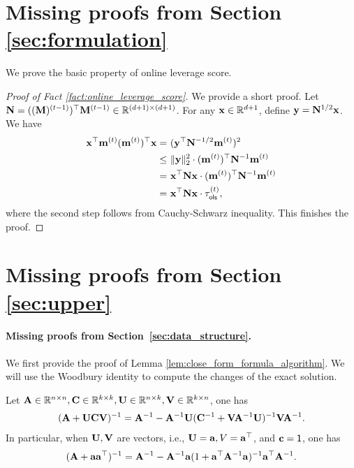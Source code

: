 \section{Missing proofs from Section \ref{sec:formulation}}
\label{sec:pre-app}
We prove the basic property of online leverage score. 
\begin{proof}[Proof of Fact \ref{fact:online_leverage_score}]
We provide a short proof.
Let $\mathbf{N} =  ((\mathbf{M})^{(t-1)})^\top \mathbf{M}^{(t-1)} \in \mathbb{R}^{(d+1)\times (d+1)}$. For any $\mathbf{x} \in \mathbb{R}^{d+1}$, define $\mathbf{y} = \mathbf{N}^{1/2} \mathbf{x}$. We have
\begin{align*}
\mathbf{x}^{\top} \mathbf{m}^{(t)} (\mathbf{m}^{(t)})^{\top} \mathbf{x} = &~ (\mathbf{y}^{\top} \mathbf{N}^{-1/2} \mathbf{m}^{(t)})^2 \\
\leq &~ \|\mathbf{y}\|_2^2 \cdot (\mathbf{m}^{(t)})^{\top} \mathbf{N}^{-1} \mathbf{m}^{(t)} \\
= &~ \mathbf{x}^{\top} \mathbf{N} \mathbf{x} \cdot (\mathbf{m}^{(t)})^{\top} \mathbf{N}^{-1} \mathbf{m}^{(t)} \\
= &~ \mathbf{x}^{\top} \mathbf{N} \mathbf{x} \cdot \tau_{\mathsf{ols}}^{(t)},
\end{align*}
where the second step follows from Cauchy-Schwarz inequality. This finishes the proof.
\end{proof}








\section{Missing proofs from Section \ref{sec:upper}}
\label{sec:upper-app}
\paragraph{Missing proofs from Section~\ref{sec:data_structure}.}
We first provide the proof of Lemma \ref{lem:close_form_formula_algorithm}. 
We will use the Woodbury identity to compute the changes of the exact solution.
\begin{fact}\label{fac:woodbury}
Let $\mathbf{A} \in \mathbb{R}^{n\times n}, \mathbf{C}\in \mathbb{R}^{k\times k}, \mathbf{U}\in \mathbb{R}^{n\times k}, \mathbf{V}\in\mathbb{R}^{k\times n}$, one has 
\begin{align*}
(\mathbf{A} + \mathbf{U}\mathbf{C}\mathbf{V})^{-1} = \mathbf{A}^{-1} - \mathbf{A}^{-1}\mathbf{U} (\mathbf{C}^{-1} + \mathbf{V}\mathbf{A}^{-1}\mathbf{U})^{-1}\mathbf{V}\mathbf{A}^{-1}.
\end{align*}
In particular, when $\mathbf{U}, \mathbf{V}$ are vectors, i.e., $\mathbf{U} = \mathbf{a}, V = \mathbf{a}^{\top}$, and $\mathbf{c} = \mathsf{1}$, one has
\begin{align*}
(\mathbf{A} + \mathbf{a}\mathbf{a}^{\top})^{-1} = \mathbf{A}^{-1} - \mathbf{A}^{-1}\mathbf{a} (1 + \mathbf{a}^{\top}\mathbf{A}^{-1}\mathbf{a})^{-1}\mathbf{a}^{\top}\mathbf{A}^{-1}.
\end{align*}
\end{fact}

